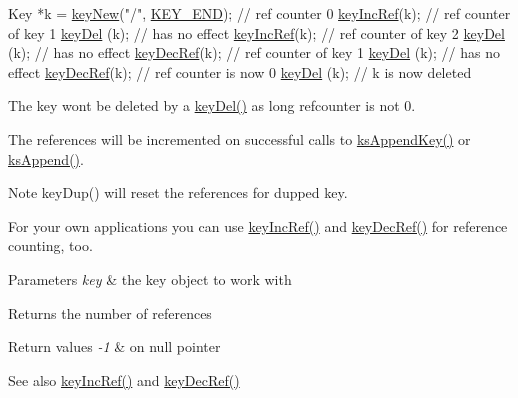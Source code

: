\begin{DoxyCodeInclude}
Key *k = \hyperlink{group__key_gad23c65b44bf48d773759e1f9a4d43b89}{keyNew}(\textcolor{stringliteral}{"/"}, \hyperlink{group__key_gga9b703ca49f48b482def322b77d3e6bc8aa8adb6fcb92dec58fb19410eacfdd403}{KEY\_END}); \textcolor{comment}{// ref counter 0}
\hyperlink{group__key_ga6970a6f254d67af7e39f8e469bb162f1}{keyIncRef}(k); \textcolor{comment}{// ref counter of key 1}
\hyperlink{group__key_ga3df95bbc2494e3e6703ece5639be5bb1}{keyDel} (k);   \textcolor{comment}{// has no effect}
\hyperlink{group__key_ga6970a6f254d67af7e39f8e469bb162f1}{keyIncRef}(k); \textcolor{comment}{// ref counter of key 2}
\hyperlink{group__key_ga3df95bbc2494e3e6703ece5639be5bb1}{keyDel} (k);   \textcolor{comment}{// has no effect}
\hyperlink{group__key_ga2c6433ca22109e4e141946057eccb283}{keyDecRef}(k); \textcolor{comment}{// ref counter of key 1}
\hyperlink{group__key_ga3df95bbc2494e3e6703ece5639be5bb1}{keyDel} (k);   \textcolor{comment}{// has no effect}
\hyperlink{group__key_ga2c6433ca22109e4e141946057eccb283}{keyDecRef}(k); \textcolor{comment}{// ref counter is now 0}
\hyperlink{group__key_ga3df95bbc2494e3e6703ece5639be5bb1}{keyDel} (k); \textcolor{comment}{// k is now deleted}
\end{DoxyCodeInclude}
 The key won\textquotesingle{}t be deleted by a \hyperlink{group__key_ga3df95bbc2494e3e6703ece5639be5bb1}{key\+Del()} as long refcounter is not 0.

The references will be incremented on successful calls to \hyperlink{group__keyset_gaa5a1d467a4d71041edce68ea7748ce45}{ks\+Append\+Key()} or \hyperlink{group__keyset_ga21eb9c3a14a604ee3a8bdc779232e7b7}{ks\+Append()}.

\begin{DoxyNote}{Note}
key\+Dup() will reset the references for dupped key.
\end{DoxyNote}
For your own applications you can use \hyperlink{group__key_ga6970a6f254d67af7e39f8e469bb162f1}{key\+Inc\+Ref()} and \hyperlink{group__key_ga2c6433ca22109e4e141946057eccb283}{key\+Dec\+Ref()} for reference counting, too.


\begin{DoxyParams}{Parameters}
{\em key} & the key object to work with \\
\hline
\end{DoxyParams}
\begin{DoxyReturn}{Returns}
the number of references 
\end{DoxyReturn}

\begin{DoxyRetVals}{Return values}
{\em -\/1} & on null pointer \\
\hline
\end{DoxyRetVals}
\begin{DoxySeeAlso}{See also}
\hyperlink{group__key_ga6970a6f254d67af7e39f8e469bb162f1}{key\+Inc\+Ref()} and \hyperlink{group__key_ga2c6433ca22109e4e141946057eccb283}{key\+Dec\+Ref()} 
\end{DoxySeeAlso}
\mbox{\label{group__key_ga6970a6f254d67af7e39f8e469bb162f1}} 
